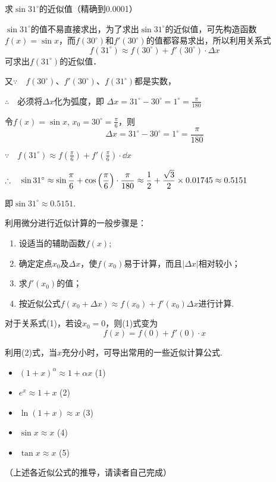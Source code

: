 \begin{example}
    求$\sin31^{\circ}$的近似值（精确到0.0001）
\end{example}

\begin{analyze}
   $\sin31^{\circ}$的值不易直接求出，为了求出$\sin31^{\circ}$的近似值，可先构造函数$f(x)=\sin x$，而$f(30^{\circ})$和$f'(30^{\circ})$的值都容易求出，所以利用关系式
\[f(31^{\circ})\approx f(30^{\circ})+f'(30^{\circ})\cdot \Delta x\]
可求出$f(31^{\circ})$的近似值．

又$\because\quad f(30^{\circ})$、$f'(30^{\circ})$、$f(31^{\circ})$都是实数，

$\therefore\quad $必须将$\Delta x$化为弧度，即
$\Delta x=31^{\circ}-30^{\circ}=1^{\circ}=\frac{\pi}{180}$
\end{analyze}

\begin{solution}
令$f(x)=\sin x$, $x_0=30^{\circ}=\frac{\pi}{6}$，则
\[\Delta x=31^{\circ}-30^{\circ}=1^{\circ}=\frac{\pi}{180}\]

$\because\quad f(31^{\circ})\approx f\left(\frac{\pi}{6}\right)+f'\left(\frac{\pi}{6}\right)\cdot \dd x$

$\therefore\quad \sin31^{\circ}\approx \sin\dfrac{\pi}{6}+\cos\left(\dfrac{\pi}{6}\right)\cdot \dfrac{\pi}{180}\approx \dfrac{1}{2}+\dfrac{\sqrt{3}}{2}\times 0.01745\approx 0.5151$

即$\sin31^{\circ}\approx 0.5151$.
\end{solution}

\begin{rmk}
    利用微分进行近似计算的一般步骤是：
\begin{enumerate}[(1)]
\item 设适当的辅助函数$f(x)$;
\item 确定定点$x_0$及$\Delta x$，使$f(x_0)$易于计算，而且$|\Delta x|$相对较小；
\item 求$f'(x_0)$的值；
\item 按近似公式$f(x_0+\Delta x)\approx f(x_0)+f'(x_0)\Delta x$进行计算.
\end{enumerate}
\end{rmk}

对于关系式(1)，若设$x_0=0$，则(1)式变为
\begin{equation}
   f(x)=f(0)+f'(0)\cdot x  \tag{2}
\end{equation}

利用(2)式，当$x$充分小时，可导出常用的一些近似计算公式.
\begin{itemize}
    \item $(1+x)^{\alpha}\approx 1+\alpha x$  \hfill (1)
    \item $e^x\approx 1+x$  \hfill (2)
    \item $\ln(1+x)\approx x$  \hfill (3)
    \item $\sin x\approx x$  \hfill (4)
    \item $\tan x\approx x$  \hfill (5)
\end{itemize}
（上述各近似公式的推导，请读者自己完成）

